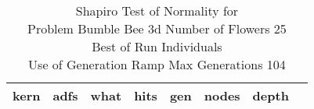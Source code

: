 \begin{table}[H]
\caption{Shapiro Test of Normality for \\ Problem  Bumble Bee 3d  Number of Flowers 25\\Best of Run Individuals \\ Use of Generation Ramp  Max Generations 104\\}
\begin{center}
\scalebox{0.8} %
{
\begin{tabular}{lrrrrrrr}
\hline
kern & adfs & what & hits & gen & nodes & depth \\
\hline


\end{tabular}
}
\end{center}
\end{table}

